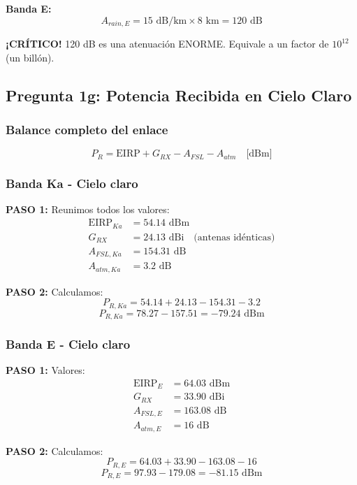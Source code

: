 \documentclass[a4paper,10pt]{article}
\begin{document}
\textbf{Banda E:}
$$A_{rain,E} = 15 \text{ dB/km} \times 8 \text{ km} = \boxed{120 \text{ dB}}$$

\textbf{¡CRÍTICO!} 120 dB es una atenuación ENORME. Equivale a un factor de $10^{12}$ (un billón).

\subsection{Pregunta 1g: Potencia Recibida en Cielo Claro}

\subsubsection{Balance completo del enlace}

$$P_R = \text{EIRP} + G_{RX} - A_{FSL} - A_{atm} \quad \text{[dBm]}$$

\subsubsection{Banda Ka - Cielo claro}

\textbf{PASO 1:} Reunimos todos los valores:
\begin{align*}
\text{EIRP}_{Ka} &= 54.14 \text{ dBm}\\
G_{RX} &= 24.13 \text{ dBi} \quad \text{(antenas idénticas)}\\
A_{FSL,Ka} &= 154.31 \text{ dB}\\
A_{atm,Ka} &= 3.2 \text{ dB}
\end{align*}

\textbf{PASO 2:} Calculamos:
$$P_{R,Ka} = 54.14 + 24.13 - 154.31 - 3.2$$
$$P_{R,Ka} = 78.27 - 157.51 = \boxed{-79.24 \text{ dBm}}$$

\subsubsection{Banda E - Cielo claro}

\textbf{PASO 1:} Valores:
\begin{align*}
\text{EIRP}_E &= 64.03 \text{ dBm}\\
G_{RX} &= 33.90 \text{ dBi}\\
A_{FSL,E} &= 163.08 \text{ dB}\\
A_{atm,E} &= 16 \text{ dB}
\end{align*}

\textbf{PASO 2:} Calculamos:
$$P_{R,E} = 64.03 + 33.90 - 163.08 - 16$$
$$P_{R,E} = 97.93 - 179.08 = \boxed{-81.15 \text{ dBm}}$$
\end{document}
